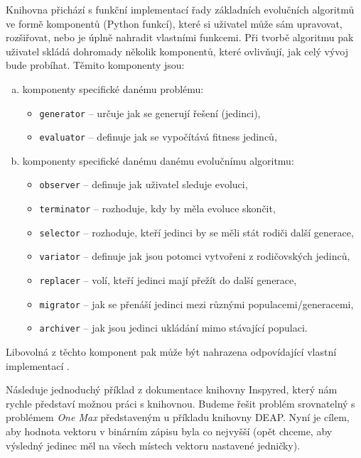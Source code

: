 Knihovna přichází s funkční implementací řady základních 
evolučních algoritmů ve formě komponentů (Python funkcí), které si uživatel
může sám upravovat, rozšiřovat, nebo je úplně nahradit vlastními funkcemi. Při
tvorbě algoritmu pak uživatel skládá dohromady několik komponentů, které
ovlivňují, jak celý vývoj bude probíhat.
Těmito komponenty jsou:
\begin{enumerate}[a)]
    \item komponenty specifické danému problému:
        \begin{itemize}
            \item \texttt{generator} -- určuje jak se generují řešení
                (jedinci),
            \item \texttt{evaluator} -- definuje jak se vypočítává fitness
                jedinců,
        \end{itemize}
    \item komponenty specifické danému danému evolučnímu algoritmu:
        \begin{itemize}
            \item \texttt{observer} -- definuje jak uživatel sleduje evoluci,
            \item \texttt{terminator} -- rozhoduje, kdy by měla evoluce
                skončit,
            \item \texttt{selector} -- rozhoduje, kteří jedinci by se měli stát
                rodiči další generace,
            \item \texttt{variator} -- definuje jak jsou potomci vytvořeni z
                rodičovských jedinců,
            \item \texttt{replacer} -- volí, kteří jedinci mají přežít do další
                generace,
            \item \texttt{migrator} -- jak se přenáší jedinci mezi různými
                populacemi/generacemi,
            \item \texttt{archiver} -- jak jsou jedinci ukládání mimo stávající
                populaci.
        \end{itemize}
\end{enumerate}

Libovolná z těchto komponent pak může být nahrazena odpovídající vlastní
implementací \citep{tonda2020inspyred}.

Následuje jednoduchý příklad z dokumentace knihovny Inspyred, který nám rychle
představí možnou práci s knihovnou. Budeme řešit problém srovnatelný s
problémem \emph{One Max} představeným u příkladu knihovny DEAP. Nyní je cílem,
aby hodnota vektoru v binárním zápisu byla co nejvyšší (opět chceme, aby
výsledný jedinec měl na všech místech vektoru nastavené jedničky). 

